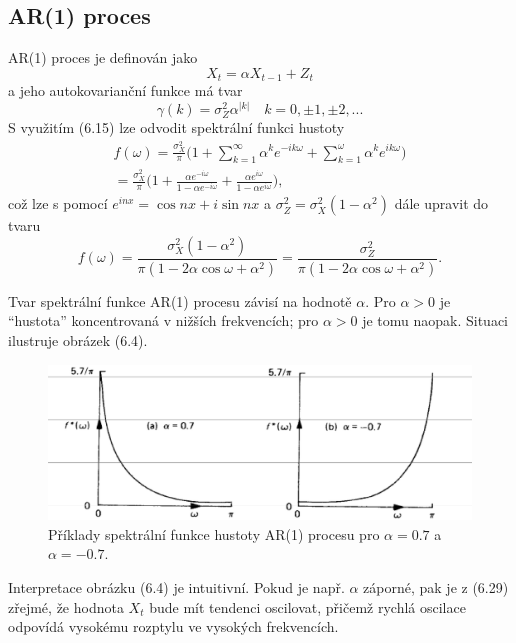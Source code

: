 \subsection{AR(1) proces}

AR(1) proces je definován jako
\begin{equation}
X_t = \alpha X_{t - 1} + Z_t
\end{equation}
a jeho autokovarianční funkce má tvar
\begin{equation}
\gamma(k) = \sigma_Z^2 \alpha^{|k|} \quad k = 0, \pm 1, \pm 2, ...
\end{equation}
S využitím (6.15) lze odvodit spektrální funkci hustoty
\begin{align}
f(\omega) = \frac{\sigma_X^2}{\pi} \Big(1 + \sum_{k = 1}^{\infty} \alpha^k e^{-ik \omega} + \sum_{k = 1}^{\omega} \alpha^k e^{ik\omega}\Big)\\
= \frac{\sigma_X^2}{\pi} \Big(1 + \frac{\alpha e^{-i \omega}}{1 - \alpha e^{-i \omega}} + \frac{\alpha e^{i \omega}}{1 - \alpha e^{i \omega}} \Big),
\end{align}
což lze s pomocí $e^{inx} = \cos nx + i \sin nx$ a $\sigma_Z^2 = \sigma_X^2(1 - \alpha^2)$ dále upravit do tvaru
\begin{equation}
f(\omega) = \frac{\sigma_X^2(1 - \alpha^2)}{\pi(1 - 2\alpha \cos \omega + \alpha^2)} = \frac{\sigma_Z^2}{\pi(1 - 2 \alpha \cos \omega + \alpha^2)}.
\end{equation}

Tvar spektrální funkce AR(1) procesu závisí na hodnotě $\alpha$. Pro $\alpha > 0$ je ``hustota'' koncentrovaná v nižších frekvencích; pro $\alpha > 0$ je tomu naopak. Situaci ilustruje obrázek (6.4).

\begin{figure}[htp]
\centering
\includegraphics[scale = 0.50]{pictures/figure_6_4.eps}
\caption{Příklady spektrální funkce hustoty AR(1) procesu pro $\alpha=0.7$ a $\alpha=-0.7$.}
\label{figure_6_4}
\end{figure}

Interpretace obrázku (6.4) je intuitivní. Pokud je např. $\alpha$ záporné, pak je z (6.29) zřejmé, že hodnota $X_t$ bude mít tendenci oscilovat, přičemž rychlá oscilace odpovídá vysokému rozptylu ve vysokých frekvencích.

